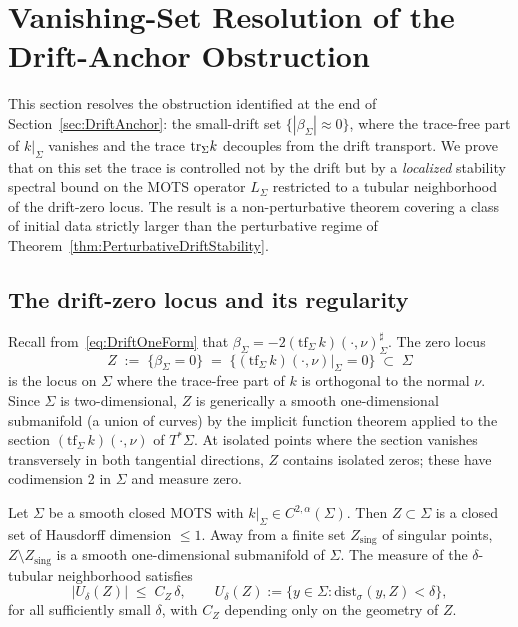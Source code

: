 \section{Vanishing-Set Resolution of the Drift-Anchor Obstruction}
\label{sec:VanishingSet}

This section resolves the obstruction identified at the end of Section~\ref{sec:DriftAnchor}: the small-drift set $\{|\beta_\Sigma|\approx0\}$, where the trace-free part of $k|_\Sigma$ vanishes and the trace $\mathrm{tr}_\Sigma k$ decouples from the drift transport. We prove that on this set the trace is controlled not by the drift but by a \emph{localized} stability spectral bound on the MOTS operator $L_\Sigma$ restricted to a tubular neighborhood of the drift-zero locus. The result is a non-perturbative theorem covering a class of initial data strictly larger than the perturbative regime of Theorem~\ref{thm:PerturbativeDriftStability}.

\subsection{The drift-zero locus and its regularity}

Recall from~\eqref{eq:DriftOneForm} that $\beta_\Sigma=-2(\mathrm{tf}_\Sigma\,k)(\cdot,\nu)^\sharp_\Sigma$. The zero locus
\begin{equation}\label{eq:DriftZeroLocus}
    Z \;:=\; \{\beta_\Sigma = 0\}\;=\;\{(\mathrm{tf}_\Sigma\,k)(\cdot,\nu)|_\Sigma = 0\}\;\subset\;\Sigma
\end{equation}
is the locus on $\Sigma$ where the trace-free part of $k$ is orthogonal to the normal $\nu$. Since $\Sigma$ is two-dimensional, $Z$ is generically a smooth one-dimensional submanifold (a union of curves) by the implicit function theorem applied to the section $(\mathrm{tf}_\Sigma\,k)(\cdot,\nu)$ of $T^*\Sigma$. At isolated points where the section vanishes transversely in both tangential directions, $Z$ contains isolated zeros; these have codimension 2 in $\Sigma$ and measure zero.

\begin{lemma}\label{lem:DriftZeroStructure}
Let $\Sigma$ be a smooth closed MOTS with $k|_\Sigma\in C^{2,\alpha}(\Sigma)$. Then $Z\subset\Sigma$ is a closed set of Hausdorff dimension $\le 1$. Away from a finite set $Z_{\mathrm{sing}}$ of singular points, $Z\setminus Z_{\mathrm{sing}}$ is a smooth one-dimensional submanifold of $\Sigma$. The measure of the $\delta$-tubular neighborhood satisfies
\begin{equation}\label{eq:TubularMeasure}
    |U_\delta(Z)| \;\le\; C_Z\,\delta,\qquad U_\delta(Z):=\{y\in\Sigma:\mathrm{dist}_\sigma(y,Z)<\delta\},
\end{equation}
for all sufficiently small $\delta$, with $C_Z$ depending only on the geometry of $Z$.
\end{lemma}

